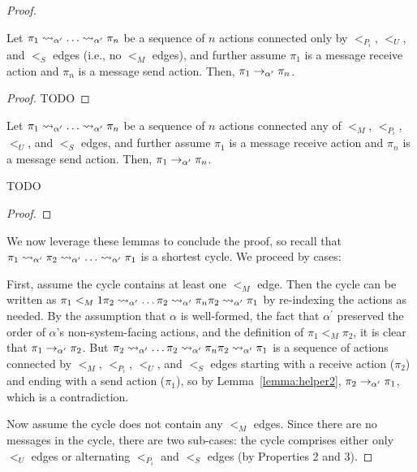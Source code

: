 \begin{proof}
  \begin{lemma}
    Let $\pi_1 \rightsquigarrow_{\alpha^\prime} \ldots \rightsquigarrow_{\alpha^\prime} \pi_n$
    be a sequence of $n$ actions connected only by
    $<_{P_i}$, $<_U$, and $<_S$ edges (i.e., no $<_M$ edges), and further
    assume $\pi_1$ is a message receive action and $\pi_n$ is a message
    send action. Then, $\pi_1 \rightarrow_{\alpha^\prime} \pi_n$.
    \label{lemma:helper1}
  \end{lemma}

  \begin{proof}
    TODO
  \end{proof}

  \begin{lemma}
    Let $\pi_1 \rightsquigarrow_{\alpha^\prime} \ldots \rightsquigarrow_{\alpha^\prime} \pi_n$
    be a sequence of $n$ actions connected any of $<_M$, $<_{P_i}$, $<_U$,
    and $<_S$ edges, and further assume $\pi_1$ is a message receive action
    and $\pi_n$ is a message send action. Then, $\pi_1 \rightarrow_{\alpha^\prime} \pi_n$.
    \label{lemma:helper2}
  \end{lemma}
    TODO
  \begin{proof}
    
  \end{proof}

  We now leverage these lemmas to conclude the proof, so recall that
  $\pi_1 \rightsquigarrow_{\alpha^\prime} \pi_2 \rightsquigarrow_{\alpha^\prime} \ldots \rightsquigarrow_{\alpha^\prime} \pi_1$
  is a shortest cycle. We proceed by cases:

  First, assume the cycle contains at least one $<_M$ edge. Then the cycle can be written as
  $\pi_1 <_M1 \pi_2 \rightsquigarrow_{\alpha^\prime} \ldots \pi_2 \rightsquigarrow_{\alpha^\prime} \pi_n \pi_2 \rightsquigarrow_{\alpha^\prime} \pi_1$ 
  by re-indexing the actions as needed. By the assumption that $\alpha$ is well-formed,
  the fact that $\alpha^\prime$ preserved the order of $\alpha$'s non-system-facing actions,
  and the definition of $\pi_1 <_M \pi_2$, it is clear that $\pi_1 \rightarrow_{\alpha^\prime} \pi_2$.
  But $\pi_2 \rightsquigarrow_{\alpha^\prime} \ldots \pi_2 \rightsquigarrow_{\alpha^\prime} \pi_n \pi_2 \rightsquigarrow_{\alpha^\prime} \pi_1$
  is a sequence of actions connected by $<_M$, $<_{P_i}$, $<_U$, and $<_S$ edges
  starting with a receive action ($\pi_2$) and ending with a send action ($\pi_1$),
  so by Lemma~\ref{lemma:helper2}, $\pi_2 \rightarrow_{\alpha^\prime} \pi_1$, which is a contradiction.

  Now assume the cycle does not contain any $<_M$ edges. Since there are no messages in
  the cycle, there are two sub-cases: the cycle comprises either only $<_U$ edges or alternating
  $<_{P_i}$ and $<_S$ edges (by Properties 2 and 3).


\end{proof}
